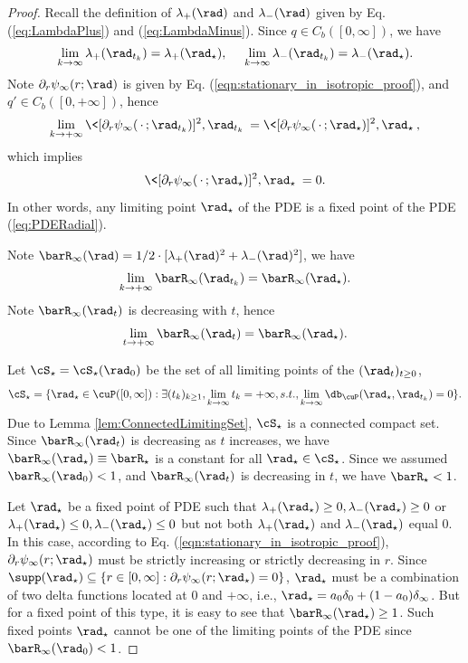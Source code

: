 \documentclass[11pt]{article}
\begin{document}
\begin{proof}
Recall the definition of $\lambda_+(\rad)$ and $\lambda_-(\rad)$ given by Eq. (\ref{eq:LambdaPlus}) and (\ref{eq:LambdaMinus}). Since $q \in C_b([0, \infty])$, we have 
\begin{align}
\lim_{k \to \infty} \lambda_+(\rad_{t_k}) = \lambda_+(\rad_\star),~~~~ \lim_{k \to \infty} \lambda_-(\rad_{t_k}) = \lambda_-(\rad_\star).
\end{align}
Note $\partial_r \psi_\infty(r; \rad)$ is given by Eq. (\ref{eqn:stationary_in_isotropic_proof}), and $q' \in C_b([0, +\infty])$, hence
\[
\lim_{k \rightarrow+\infty} \< [\partial_r \psi_\infty(\, \cdot \,; \rad_{t_k})]^2, \rad_{t_k}\> = \< [\partial_r \psi_\infty(\, \cdot \,; \rad_\star )]^2, \rad_\star \>,
\]
which implies
\[
\< [\partial_r \psi_\infty(\, \cdot \,; \rad_\star )]^2, \rad_\star \> = 0.
\]
In other words, any limiting point $\rad_\star$ of the PDE is a fixed point of the PDE (\ref{eq:PDERadial}). 

Note $\barR_\infty(\rad) = 1/2 \cdot [\lambda_+(\rad)^2 + \lambda_-(\rad)^2]$, we have
\[
\lim_{k\rightarrow +\infty} \barR_\infty(\rad_{t_k}) = \barR_\infty(\rad_\star). 
\]
Note $\barR_\infty(\rad_t)$ is decreasing with $t$, hence
\[
\lim_{t\rightarrow +\infty} \barR_\infty(\rad_t) = \barR_\infty(\rad_\star). 
\]

Let $\cS_\star = \cS_\star(\rad_0)$ be the set of all limiting points of the $(\rad_t)_{t \ge 0}$, 
\[
\cS_\star = \{\rad_\star \in \cuP([0, \infty]): \exists (t_k)_{k \ge 1}, \lim_{k\rightarrow \infty} t_k = +\infty, s.t., \lim_{k \to \infty} \db_\cuP(\rad_\star, \rad_{t_k}) = 0 \}. 
\]
Due to Lemma \ref{lem:ConnectedLimitingSet}, $\cS_\star$ is a connected compact set. Since $\barR_\infty(\rad_t)$ is decreasing as $t$ increases, we have $\barR_\infty(\rad_\star) \equiv \barR_\star$ is a constant for all $\rad_\star \in \cS_\star$. Since we assumed $\barR_\infty(\rad_0) < 1$, and $\barR_\infty(\rad_t)$ is decreasing in $t$, we have $\barR_\star < 1$. 




Let $\rad_\star$ be a fixed point of PDE such that $\lambda_+(\rad_\star) \ge 0, \lambda_-(\rad_\star) \ge 0$ or $\lambda_+(\rad_\star) \le 0, \lambda_-(\rad_\star) \le 0$ but not both $\lambda_+(\rad_\star)$ and $\lambda_-(\rad_\star)$ equal $0$. In this case, according to Eq. (\ref{eqn:stationary_in_isotropic_proof}), $\partial_r \psi_\infty(r; \rad_\star)$ must be strictly increasing or strictly decreasing in $r$. Since $\supp(\rad_\star) \subseteq \{ r \in [0, \infty]:  \partial_r \psi_\infty(r; \rad_\star) = 0\}$, $\rad_\star$ must be a combination of two delta functions located at $0$ and $+\infty$, i.e., $\rad_\star = a_0 \delta_0 + (1 - a_0) \delta_\infty$. But for a fixed point of this type, it is easy to see that $\barR_\infty(\rad_\star) \ge 1$. Such fixed points $\rad_\star$ cannot be one of the limiting points of the PDE since $\barR_\infty(\rad_0) < 1$. 


\end{proof}
\end{document}
